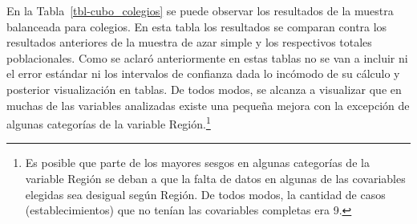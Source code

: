 \documentclass[
  spanish,
  a4paper,
]{scrreprt}
\begin{document}
En la Tabla~\ref{tbl-cubo_colegios} se puede observar los resultados de
la muestra balanceada para colegios. En esta tabla los resultados se
comparan contra los resultados anteriores de la muestra de azar simple y
los respectivos totales poblacionales. Como se aclaró anteriormente en
estas tablas no se van a incluir ni el error estándar ni los intervalos
de confianza dada lo incómodo de su cálculo y posterior visualización en
tablas. De todos modos, se alcanza a visualizar que en muchas de las
variables analizadas existe una pequeña mejora con la excepción de
algunas categorías de la variable Región.\footnote{Es posible que parte
  de los mayores sesgos en algunas categorías de la variable Región se
  deban a que la falta de datos en algunas de las covariables elegidas
  sea desigual según Región. De todos modos, la cantidad de casos
  (establecimientos) que no tenían las covariables completas era 9.}
\end{document}
